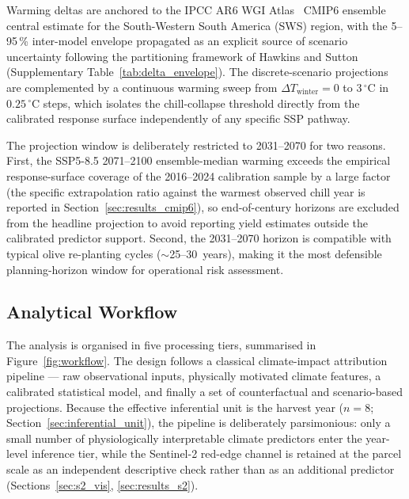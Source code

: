\documentclass[agronomy,article,submit,pdftex,moreauthors]{Definitions/mdpi}
\begin{document}
Warming deltas are anchored to the IPCC AR6 WGI Atlas~\cite{ipcc2021atlas} CMIP6 ensemble central estimate for the South-Western South America (SWS) region, with the 5--95\,\% inter-model envelope propagated as an explicit source of scenario uncertainty following the partitioning framework of Hawkins and Sutton~\cite{hawkinssutton2009} (Supplementary Table~\ref{tab:delta_envelope}). The discrete-scenario projections are complemented by a continuous warming sweep from $\Delta T_{\text{winter}}=0$ to $3\,^\circ$C in $0.25\,^\circ$C steps, which isolates the chill-collapse threshold directly from the calibrated response surface independently of any specific SSP pathway.

The projection window is deliberately restricted to 2031--2070 for two reasons. First, the SSP5-8.5 2071--2100 ensemble-median warming exceeds the empirical response-surface coverage of the 2016--2024 calibration sample by a large factor (the specific extrapolation ratio against the warmest observed chill year is reported in Section~\ref{sec:results_cmip6}), so end-of-century horizons are excluded from the headline projection to avoid reporting yield estimates outside the calibrated predictor support. Second, the 2031--2070 horizon is compatible with typical olive re-planting cycles ($\sim$25--30~years), making it the most defensible planning-horizon window for operational risk assessment.

\subsection{Analytical Workflow}
\label{sec:workflow}

The analysis is organised in five processing tiers, summarised in Figure~\ref{fig:workflow}. The design follows a classical climate-impact attribution pipeline --- raw observational inputs, physically motivated climate features, a calibrated statistical model, and finally a set of counterfactual and scenario-based projections. Because the effective inferential unit is the harvest year ($n=8$; Section~\ref{sec:inferential_unit}), the pipeline is deliberately parsimonious: only a small number of physiologically interpretable climate predictors enter the year-level inference tier, while the Sentinel-2 red-edge channel is retained at the parcel scale as an independent descriptive check rather than as an additional predictor (Sections~\ref{sec:s2_vis}, \ref{sec:results_s2}).
\end{document}
